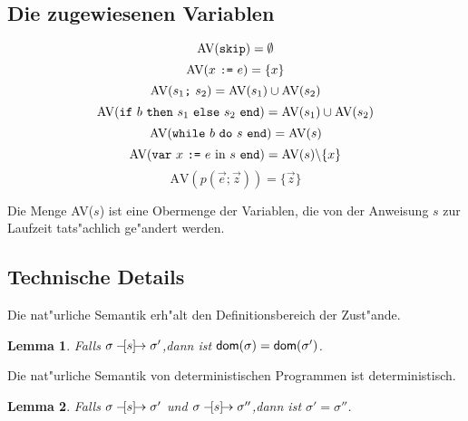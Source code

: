 \documentclass[german,10pt, a4paper, twocolumn]{scrartcl}
\newcommand{\natsemarr}[1]{\ensuremath{-\hspace*{-1.52mm}[#1]\hspace*{-1.61mm}\rightarrow}}
\newtheorem{lemma}{Lemma}[section]
\theoremstyle{definition}
\theoremstyle{remark}
\begin{document}
\twocolumn

\subsection{Die zugewiesenen Variablen}

\begin{displaymath}
	\mbox{AV}(\mbox{\tt skip}) = \emptyset
\end{displaymath}
\begin{displaymath}
	\mbox{AV}(x\ \mbox{\tt :=}\ e) = \{x\}
\end{displaymath}
\begin{displaymath}
	\mbox{AV}(s_1 \mbox{\tt ;}\ s_2) = \mbox{AV}(s_1)\cup \mbox{AV}(s_2)
\end{displaymath}
\begin{displaymath}
	\mbox{AV}(\mbox{\tt if}\ b\ \mbox{\tt then}\ s_1\ \mbox{\tt else}\ s_2\ \mbox{\tt end}) = \mbox{AV}(s_1)\cup \mbox{AV}(s_2)
\end{displaymath}
\begin{displaymath}
	\mbox{AV}(\mbox{\tt while}\ b\ \mbox{\tt do}\ s\ \mbox{\tt end}) = \mbox{AV}(s)
\end{displaymath}
\begin{displaymath}
	\mbox{AV}(\mbox{\tt var}\ x\ \mbox{\tt :=}\ e\ \mbox{in}\ s\ \mbox{\tt end}) = \mbox{AV}(s) \backslash \{x\}
\end{displaymath}
\begin{displaymath}
	\mbox{AV}(p(\vec{e};\vec{z})) = \{ \vec{z}\}
\end{displaymath}

Die Menge AV($s$) ist eine Obermenge der Variablen, die von der Anweisung $s$ zur Laufzeit tats"achlich ge"andert werden.

\subsection{Technische Details}

Die nat"urliche Semantik erh"alt den Definitionsbereich der Zust"ande.

\begin{lemma}
	Falls $\sigma \natsemarr{s}\sigma'$,\hfill dann ist $\textnormal{\textsf{dom}}(\sigma)=\textnormal{\textsf{dom}}(\sigma')$.
\end{lemma}

Die nat"urliche Semantik von deterministischen Programmen ist deterministisch.
\begin{lemma}
	Falls $\sigma \natsemarr{s}\sigma'$ und $\sigma \natsemarr{s} \sigma''$,\hfill dann ist $\sigma' = \sigma''$.
\end{lemma}
\end{document}
